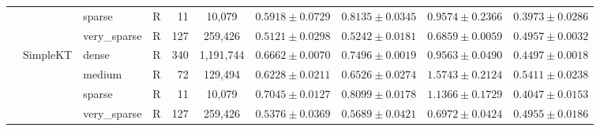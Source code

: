 \begin{table}[tbp]
{\begin{tabular}{lllcrccccc}
 &  & sparse & R & 11 & 10,079 & $0.5918 \pm 0.0729$ & $0.8135 \pm 0.0345$ & $0.9574 \pm 0.2366$ & $0.3973 \pm 0.0286$ \\
 &  & very\_sparse & R & 127 & 259,426 & $0.5121 \pm 0.0298$ & $0.5242 \pm 0.0181$ & $0.6859 \pm 0.0059$ & $0.4957 \pm 0.0032$ \\
 & SimpleKT & dense & R & 340 & 1,191,744 & $0.6662 \pm 0.0070$ & $0.7496 \pm 0.0019$ & $0.9563 \pm 0.0490$ & $0.4497 \pm 0.0018$ \\
 &  & medium & R & 72 & 129,494 & $0.6228 \pm 0.0211$ & $0.6526 \pm 0.0274$ & $1.5743 \pm 0.2124$ & $0.5411 \pm 0.0238$ \\
 &  & sparse & R & 11 & 10,079 & $0.7045 \pm 0.0127$ & $0.8099 \pm 0.0178$ & $1.1366 \pm 0.1729$ & $0.4047 \pm 0.0153$ \\
 &  & very\_sparse & R & 127 & 259,426 & $0.5376 \pm 0.0369$ & $0.5689 \pm 0.0421$ & $0.6972 \pm 0.0424$ & $0.4955 \pm 0.0186$ \\
\bottomrule
\end{tabular}%
}
\end{table}
